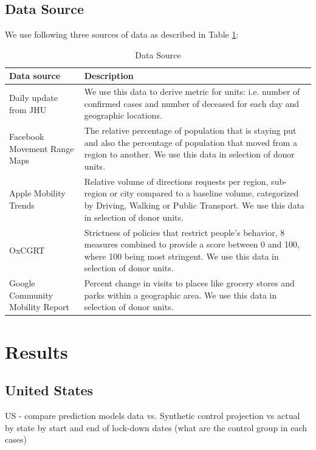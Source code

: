 \documentclass[preprint,authoryear,12pt]{elsarticle}
\begin{document}
	\subsection{Data Source}
	We use following three sources of data as described in Table \ref{Table1}:
	
	\begin{table}[h!]
		\centering
		\begin{tabularx}{0.9\textwidth}[t]{p{}X}
			\hline
			\textbf{Data source} &  \textbf{Description}\\ [0.5ex]
			\hline\hline
			Daily update from JHU  \cite{DDG2020}  & We use this data to derive metric for units: i.e. number of confirmed cases and number of deceased for each day and geographic locations.\\ [1ex]
			\hline
			Facebook Movement Range Maps \cite{JM2020} & The relative percentage of population that is staying put and also the percentage of population that moved from a region to another. We use this data in selection of donor units.\\
			\hline
			Apple Mobility Trends\cite{Apple2020} & Relative volume of directions requests per region, sub-region or city compared to a baseline volume, categorized by Driving, Walking or Public Transport. We use this data in selection of donor units.\\
			\hline
			OxCGRT  \cite{HWP2020} &  Strictness of policies that restrict people’s behavior, 8 measures combined to provide a score between 0 and 100, where 100 being most stringent. We use this data in selection of donor units.\\
			\hline
			Google Community Mobility Report \cite{Goog2020} &  Percent change in visits to places like grocery stores and parks within a geographic area. We use this data in selection of donor units.\\ [1ex] 
			\hline
		\end{tabularx}
		\caption{Data Source}
		\label{Table1}
	\end{table}
	 
\section{Results}
\label{SEC3}
	\subsection{United States}
	US - compare prediction models data vs. Synthetic control projection vs actual by state by start and end of lock-down dates (what are the control group in each cases)
	
\end{document}

